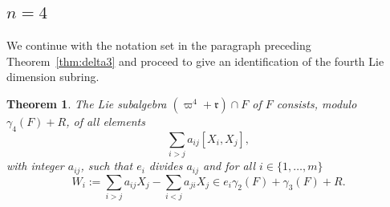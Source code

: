 \documentclass[a4paper,reqno,notitlepage]{amsart}
\newtheorem{theorem}{Theorem}[section]
\theoremstyle{definition}
\newcommand\rr{{\mathfrak r}}
\begin{document}
\subsection{\boldmath $n=4$} We continue with the notation set in the
paragraph preceding Theorem~\ref{thm:delta3} and proceed to give an
identification of the fourth Lie dimension subring.

\begin{theorem}\label{thm:delta4}
  The Lie subalgebra $(\varpi^4+\rr)\cap F$ of $F$ consists, modulo
  $\gamma_4(F)+R$, of all elements
  \begin{equation}\label{delta_4}
    \sum_{i>j}a_{ij}[X_i,X_j],
  \end{equation}
  with integer $a_{ij}$, such that $e_i$ divides $a_{ij}$ and for all
  $i\in\{1,\dots,m\}$
  \[W_i:=\sum_{i>j}a_{ij}X_j-\sum_{i<j}a_{ji}X_j\in e_i\gamma_2(F)+\gamma_3(F)+R.\]
\end{theorem}  
\end{document}
